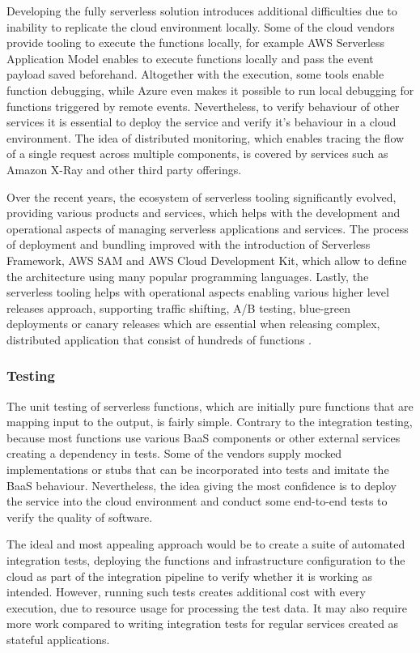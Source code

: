 Developing the fully serverless solution introduces additional difficulties due to inability to replicate the cloud environment locally. Some of the cloud vendors provide tooling to execute the functions locally, for example AWS Serverless Application Model enables to execute functions locally and pass the event payload saved beforehand. Altogether with the execution, some tools enable function debugging, while Azure even makes it possible to run local debugging for functions triggered by remote events. Nevertheless, to verify behaviour of other services it is essential to deploy the service and verify it's behaviour in a cloud environment. The idea of distributed monitoring, which enables tracing the flow of a single request across multiple components, is covered by services such as Amazon X-Ray and other third party offerings.

Over the recent years, the ecosystem of serverless tooling significantly evolved, providing various products and services, which helps with the development and operational aspects of managing serverless applications and services. The process of deployment and bundling improved with the introduction of Serverless Framework, AWS SAM and AWS Cloud Development Kit, which allow to define the architecture using many popular programming languages. Lastly, the serverless tooling helps with operational aspects enabling various higher level releases approach, supporting traffic shifting, A/B testing, blue-green deployments or canary releases which are essential when releasing complex, distributed application that consist of hundreds of functions \cite{MartinFowlerServerless}.

\subsubsection*{Testing}

The unit testing of serverless functions, which are initially pure functions that are mapping input to the output, is fairly simple. Contrary to the integration testing, because most functions use various BaaS components or other external services creating a dependency in tests. Some of the vendors supply mocked implementations or stubs that can be  incorporated into tests and imitate the BaaS behaviour. Nevertheless, the idea giving the most confidence is to deploy the service into the cloud environment and conduct some end-to-end tests to verify the quality of software.

The ideal and most appealing approach would be to create a suite of automated integration tests, deploying the functions and infrastructure configuration to the cloud as part of the integration pipeline to verify whether it is working as intended. However, running such tests creates additional cost with every execution, due to resource usage for processing the test data. It may also require more work compared to writing integration tests for regular services created as stateful applications. 

